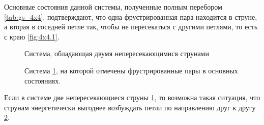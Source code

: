 \documentclass[utf8, babel, sor, jor, amsmath,amssymb, reprint]{elsarticle} %
\begin{document}
Основные состояния данной системы, полученные полным перебором \ref{tab:gs_4x4}, подтверждают, что одна фрустрированная пара находится в струне, а вторая в соседней петле так, чтобы не пересекаться с другими петлями, то есть с краю \ref{fig:4x4.1}.

\begin{figure}[h]
	\centering
	\caption{Система, обладающая двумя непересекающимися струнами}
	\label{fig:4x7}
\end{figure}
\begin{figure}[h]
	\centering
	\caption{Система \ref{fig:4x7}, на которой отмечены фрустрированные пары  в основных состояниях.}
	\label{fig:4x7F}
\end{figure}

Если в системе две непересекающиеся струны \ref{fig:4x7}, то возможна такая ситуация, что струнам энергетически выгоднее возбуждать петли по направлению друг к другу \ref{fig:4x7F}.
\end{document}
